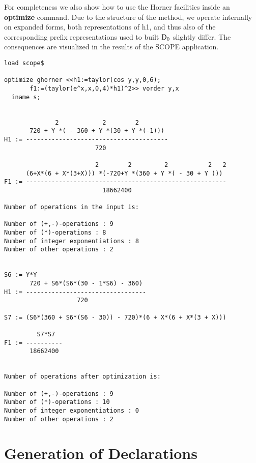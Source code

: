 For completeness we also show how to use the Horner facilities inside
an {\bf optimize} command. Due to the structure of the method, we
operate internally on expanded forms, both representations of h1, and
thus also of the corresponding prefix representations used to built
${{\rm D}}_{0}$ slightly differ. The consequences are visualized in
the results of the SCOPE application.
{\small
\begin{verbatim}
load scope$

optimize ghorner <<h1:=taylor(cos y,y,0,6);
       f1:=(taylor(e^x,x,0,4)*h1)^2>> vorder y,x
  iname s;


              2            2        2
       720 + Y *( - 360 + Y *(30 + Y *(-1)))
H1 := ---------------------------------------
                         720

                         2        2         2           2   2
      (6+X*(6 + X*(3+X))) *(-720+Y *(360 + Y *( - 30 + Y )))
F1 := -------------------------------------------------------
                           18662400

Number of operations in the input is: 

Number of (+,-)-operations : 9
Number of (*)-operations : 8
Number of integer exponentiations : 8
Number of other operations : 2


S6 := Y*Y
       720 + S6*(S6*(30 - 1*S6) - 360)
H1 := ---------------------------------
                    720

S7 := (S6*(360 + S6*(S6 - 30)) - 720)*(6 + X*(6 + X*(3 + X)))

         S7*S7
F1 := ----------
       18662400


Number of operations after optimization is:

Number of (+,-)-operations : 9
Number of (*)-operations : 10
Number of integer exponentiations : 0
Number of other operations : 2
\end{verbatim}
}

\section{Generation of Declarations}\label{SCOPE:decl}

